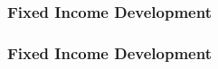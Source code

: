 \documentclass[compress]{beamer}
\begin{document}
{\begin{frame}[plain]
\begin{center}
	\end{center}
\end{frame}
\begin{frame}[plain]
	\frametitle{Fixed Income Development}
	\textcolor{white}{}
	\begin{center}
	\end{center}
\end{frame}
\begin{frame}[plain]
	\frametitle{Fixed Income Development}
	\textcolor{white}{}
	\begin{center}
	\end{center}

\end{frame}}
\end{document}
